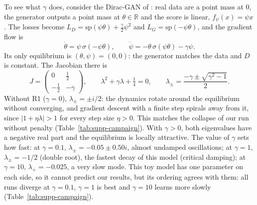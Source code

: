 To see what $\gamma$ does, consider the Dirac-GAN of \cite{mescheder2018}: real data are a point mass at $0$, the generator outputs a point mass at $\theta\in\mathbb R$ and the score is linear, $f_\psi(x)=\psi x$. The losses become $L_D=\mathrm{sp}(\psi\theta)+\frac\gamma2\psi^2$ and $L_G=\mathrm{sp}(-\psi\theta)$, and the gradient flow is
\begin{equation}
  \dot\theta=\psi\,\sigma(-\psi\theta),\qquad \dot\psi=-\theta\,\sigma(\psi\theta)-\gamma\psi .
\end{equation}
Its only equilibrium is $(\theta,\psi)=(0,0)$: the generator matches the data and $D$ is constant. The Jacobian there is
\begin{equation}
  J=\begin{pmatrix}0 & \tfrac12\\[2pt] -\tfrac12 & -\gamma\end{pmatrix},
  \qquad
  \lambda^2+\gamma\lambda+\tfrac14=0,
  \qquad
  \lambda_\pm=\frac{-\gamma\pm\sqrt{\gamma^2-1}}{2}.
\end{equation}
Without R1 ($\gamma=0$), $\lambda_\pm=\pm i/2$: the dynamics rotate around the equilibrium without converging, and gradient descent with a finite step spirals away from it, since $|1+\eta\lambda|>1$ for every step size $\eta>0$. This matches the collapse of our run without penalty (Table~\ref{tab:supp-campaign}). With $\gamma>0$, both eigenvalues have a negative real part and the equilibrium is locally attractive. The value of $\gamma$ sets how fast: at $\gamma=0.1$, $\lambda_\pm=-0.05\pm0.50i$, almost undamped oscillations; at $\gamma=1$, $\lambda_\pm=-1/2$ (double root), the fastest decay of this model (critical damping); at $\gamma=10$, $\lambda_+=-0.025$, a very slow mode. This toy model has one parameter on each side, so it cannot predict our results, but its ordering agrees with them: all runs diverge at $\gamma=0.1$, $\gamma=1$ is best and $\gamma=10$ learns more slowly (Table~\ref{tab:supp-campaign}).

